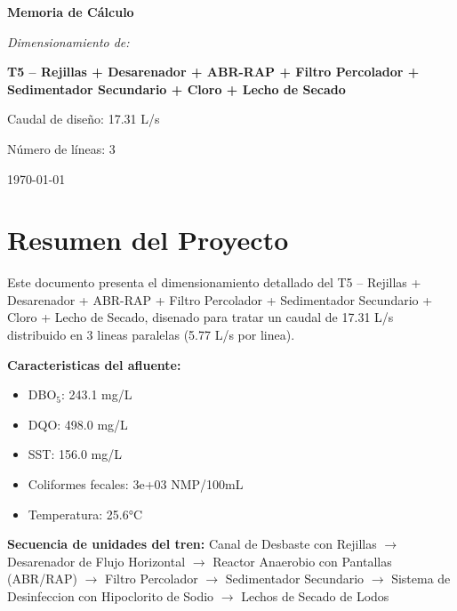 \documentclass[12pt,a4paper]{article}
\begin{document}
\begin{titlepage}
\centering
\vspace*{2cm}

{\Huge\bfseries Memoria de Cálculo\par}
\vspace{1.5cm}

{\Large\itshape Dimensionamiento de:\par}
\vspace{0.5cm}

{\LARGE\bfseries T5 – Rejillas + Desarenador + ABR-RAP + Filtro Percolador + Sedimentador Secundario + Cloro + Lecho de Secado\par}
\vspace{2cm}

{\large Caudal de diseño: 17.31 L/s\par}
{\large Número de líneas: 3\par}
\vfill
{\large\today\par}
\end{titlepage}

\tableofcontents

\listoffigures

\listoftables

\newpage
\section{Resumen del Proyecto}

Este documento presenta el dimensionamiento detallado del T5 – Rejillas + Desarenador + ABR-RAP + Filtro Percolador + Sedimentador Secundario + Cloro + Lecho de Secado, disenado para tratar un caudal de 17.31 L/s distribuido en 3 lineas paralelas (5.77 L/s por linea).

\textbf{Caracteristicas del afluente:}
\begin{itemize}
    \item DBO$_5$: 243.1 mg/L
    \item DQO: 498.0 mg/L
    \item SST: 156.0 mg/L
    \item Coliformes fecales: 3e+03 NMP/100mL
    \item Temperatura: 25.6°C
\end{itemize}

\textbf{Secuencia de unidades del tren:} 
Canal de Desbaste con Rejillas $\rightarrow$ Desarenador de Flujo Horizontal $\rightarrow$ Reactor Anaerobio con Pantallas (ABR/RAP) $\rightarrow$ Filtro Percolador $\rightarrow$ Sedimentador Secundario $\rightarrow$ Sistema de Desinfeccion con Hipoclorito de Sodio $\rightarrow$ Lechos de Secado de Lodos
\end{document}
